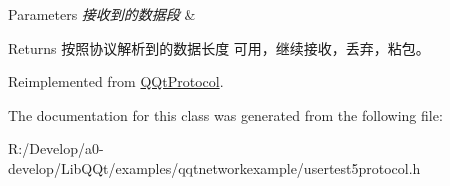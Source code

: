 \begin{DoxyParams}{Parameters}
{\em 接收到的数据段} & \\
\hline
\end{DoxyParams}
\begin{DoxyReturn}{Returns}
按照协议解析到的数据长度 可用，继续接收，丢弃，粘包。 
\end{DoxyReturn}


Reimplemented from \mbox{\hyperlink{class_q_qt_protocol_a00fd0c1ac23379ed3b9b25da9a34f39b}{Q\+Qt\+Protocol}}.



The documentation for this class was generated from the following file\+:\begin{DoxyCompactItemize}
\item 
R\+:/\+Develop/a0-\/develop/\+Lib\+Q\+Qt/examples/qqtnetworkexample/usertest5protocol.\+h\end{DoxyCompactItemize}
